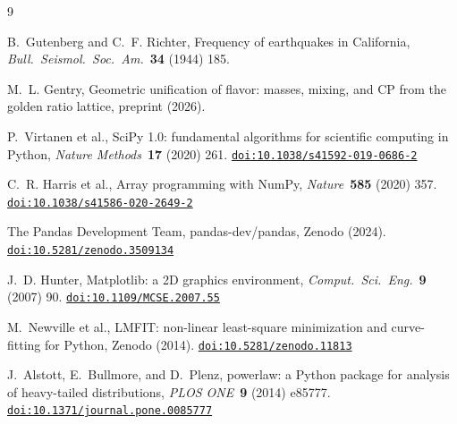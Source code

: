 \documentclass[10pt,a4paper]{article}
\newcommand{\doi}[1]{\href{https://doi.org/#1}{\texttt{doi:#1}}}
\begin{document}
\begin{thebibliography}{9}

B.~Gutenberg and C.~F. Richter,
Frequency of earthquakes in California,
\textit{Bull.\ Seismol.\ Soc.\ Am.}\ \textbf{34} (1944) 185.

M.~L. Gentry,
Geometric unification of flavor: masses, mixing, and CP
from the golden ratio lattice, preprint (2026).

P.~Virtanen et al.,
SciPy 1.0: fundamental algorithms for scientific computing in Python,
\textit{Nature Methods}\ \textbf{17} (2020) 261.
\doi{10.1038/s41592-019-0686-2}

C.~R. Harris et al.,
Array programming with NumPy,
\textit{Nature}\ \textbf{585} (2020) 357.
\doi{10.1038/s41586-020-2649-2}

The Pandas Development Team,
pandas-dev/pandas, Zenodo (2024).
\doi{10.5281/zenodo.3509134}

J.~D. Hunter,
Matplotlib: a 2D graphics environment,
\textit{Comput.\ Sci.\ Eng.}\ \textbf{9} (2007) 90.
\doi{10.1109/MCSE.2007.55}

M.~Newville et al.,
LMFIT: non-linear least-square minimization and curve-fitting for Python,
Zenodo (2014).
\doi{10.5281/zenodo.11813}

J.~Alstott, E.~Bullmore, and D.~Plenz,
powerlaw: a Python package for analysis of heavy-tailed distributions,
\textit{PLOS ONE}\ \textbf{9} (2014) e85777.
\doi{10.1371/journal.pone.0085777}

\end{thebibliography}
\end{document}
